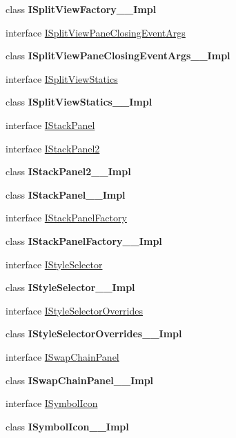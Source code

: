 \begin{DoxyCompactItemize}
\item 
class {\bfseries I\+Split\+View\+Factory\+\_\+\+\_\+\+Impl}
\item 
interface \hyperlink{interface_windows_1_1_u_i_1_1_xaml_1_1_controls_1_1_i_split_view_pane_closing_event_args}{I\+Split\+View\+Pane\+Closing\+Event\+Args}
\item 
class {\bfseries I\+Split\+View\+Pane\+Closing\+Event\+Args\+\_\+\+\_\+\+Impl}
\item 
interface \hyperlink{interface_windows_1_1_u_i_1_1_xaml_1_1_controls_1_1_i_split_view_statics}{I\+Split\+View\+Statics}
\item 
class {\bfseries I\+Split\+View\+Statics\+\_\+\+\_\+\+Impl}
\item 
interface \hyperlink{interface_windows_1_1_u_i_1_1_xaml_1_1_controls_1_1_i_stack_panel}{I\+Stack\+Panel}
\item 
interface \hyperlink{interface_windows_1_1_u_i_1_1_xaml_1_1_controls_1_1_i_stack_panel2}{I\+Stack\+Panel2}
\item 
class {\bfseries I\+Stack\+Panel2\+\_\+\+\_\+\+Impl}
\item 
class {\bfseries I\+Stack\+Panel\+\_\+\+\_\+\+Impl}
\item 
interface \hyperlink{interface_windows_1_1_u_i_1_1_xaml_1_1_controls_1_1_i_stack_panel_factory}{I\+Stack\+Panel\+Factory}
\item 
class {\bfseries I\+Stack\+Panel\+Factory\+\_\+\+\_\+\+Impl}
\item 
interface \hyperlink{interface_windows_1_1_u_i_1_1_xaml_1_1_controls_1_1_i_style_selector}{I\+Style\+Selector}
\item 
class {\bfseries I\+Style\+Selector\+\_\+\+\_\+\+Impl}
\item 
interface \hyperlink{interface_windows_1_1_u_i_1_1_xaml_1_1_controls_1_1_i_style_selector_overrides}{I\+Style\+Selector\+Overrides}
\item 
class {\bfseries I\+Style\+Selector\+Overrides\+\_\+\+\_\+\+Impl}
\item 
interface \hyperlink{interface_windows_1_1_u_i_1_1_xaml_1_1_controls_1_1_i_swap_chain_panel}{I\+Swap\+Chain\+Panel}
\item 
class {\bfseries I\+Swap\+Chain\+Panel\+\_\+\+\_\+\+Impl}
\item 
interface \hyperlink{interface_windows_1_1_u_i_1_1_xaml_1_1_controls_1_1_i_symbol_icon}{I\+Symbol\+Icon}
\item 
class {\bfseries I\+Symbol\+Icon\+\_\+\+\_\+\+Impl}
\item 

\end{DoxyCompactItemize}

